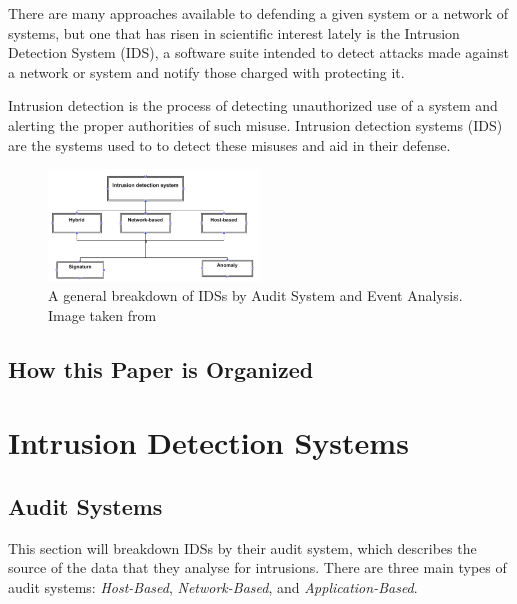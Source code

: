 \documentclass{acm_proc_article-sp}
\begin{document}
	There are many approaches available to defending a given system or a network of systems, but one that has risen in scientific interest lately is the Intrusion Detection System (IDS), a software suite intended to detect attacks made against a network or system and notify those charged with protecting it.
	
	Intrusion detection is the process of detecting unauthorized use of a system and alerting the proper authorities of such misuse. Intrusion detection systems (IDS) are the systems used to to detect these misuses and aid in their defense. 
	\begin{figure}[h!]
		\centering
		\includegraphics[width=0.5\textwidth]{idsBreakdown.png}
		\caption{A general breakdown of IDSs by Audit System and Event Analysis. Image taken from \cite{Alenezi2012}}
		\label{breakdown}
	\end{figure}
    \subsection{How this Paper is Organized}
    	
\section{Intrusion Detection Systems}

    \subsection{Audit Systems}
    	This section will breakdown IDSs by their audit system, which describes the source of the data that they analyse for intrusions. There are three main types of audit systems: \emph{Host-Based}, \emph{Network-Based}, and \emph{Application-Based}.
\end{document}
